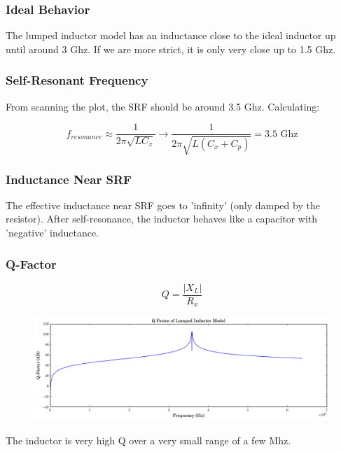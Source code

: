 \documentclass[11pt]{article}
\begin{document}
\subsubsection{Ideal Behavior}
The lumped inductor model has an inductance close to the ideal inductor up until around 3 Ghz. If we are more strict, it is only very close up to 1.5 Ghz.

\subsubsection{Self-Resonant Frequency}
From scanning the plot, the SRF should be around 3.5 Ghz. Calculating:

\begin{equation*}
	f_{resonance} \approx \frac{1}{2 \pi \sqrt{L C_{x}}} \rightarrow \frac{1}{2 \pi \sqrt{L (C_{x} + C_p)}} = 3.5 \text{ Ghz}
\end{equation*}

\subsubsection{Inductance Near SRF}
The effective inductance near SRF goes to 'infinity' (only damped by the resistor). After self-resonance, the inductor behaves like a capacitor with 'negative' inductance.

\subsubsection{Q-Factor}
\begin{equation*}
	Q = \frac{|X_L|}{R_x}
\end{equation*}
\begin{figure}[H]
	\centering \includegraphics[width=\textwidth]{images/inductor_q.png}
\end{figure}

The inductor is very high Q over a very small range of a few Mhz.
\end{document}
